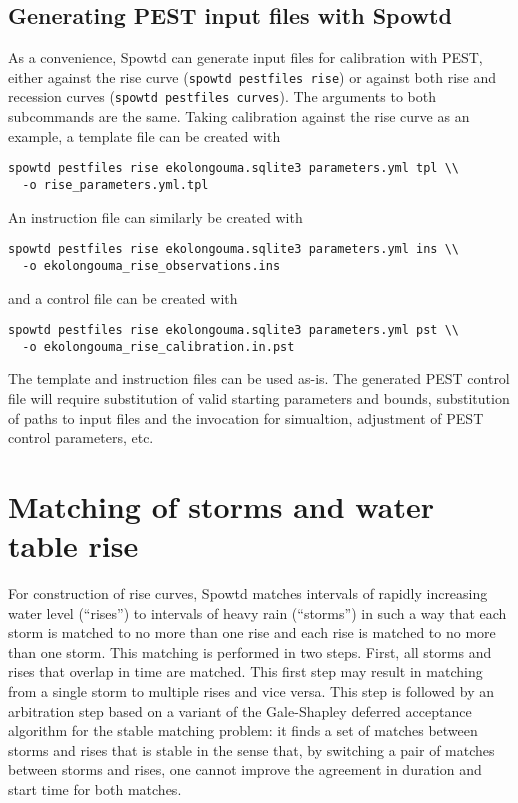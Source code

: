 \documentclass[11pt,a4paper]{article}
\begin{document}
\subsection{Generating PEST input files with Spowtd}
As a convenience, Spowtd can generate input files for calibration with
PEST, either against the rise curve (\texttt{spowtd pestfiles rise})
or against both rise and recession curves (\texttt{spowtd pestfiles
  curves}).  The arguments to both subcommands are the same.  Taking
calibration against the rise curve as an example, a template file
can be created with
\begin{lstlisting}[frame=single]
spowtd pestfiles rise ekolongouma.sqlite3 parameters.yml tpl \\
  -o rise_parameters.yml.tpl
\end{lstlisting}
An instruction file can similarly be created with
\begin{lstlisting}[frame=single]
spowtd pestfiles rise ekolongouma.sqlite3 parameters.yml ins \\
  -o ekolongouma_rise_observations.ins
\end{lstlisting}
and a control file can be created with
\begin{lstlisting}[frame=single]
spowtd pestfiles rise ekolongouma.sqlite3 parameters.yml pst \\
  -o ekolongouma_rise_calibration.in.pst
\end{lstlisting}
The template and instruction files can be used as-is.  The generated
PEST control file will require substitution of valid starting
parameters and bounds, substitution of paths to input files and the
invocation for simualtion, adjustment of PEST control parameters, etc.




\appendix

\section{Matching of storms and water table rise}
\label{a:storm_matching}

For construction of rise curves, Spowtd matches intervals of rapidly
increasing water level (``rises'') to intervals of heavy rain
(``storms'') in such a way that each storm is matched to no more than
one rise and each rise is matched to no more than one storm.  This
matching is performed in two steps.  First, all storms and rises that
overlap in time are matched.  This first step may result in matching
from a single storm to multiple rises and vice versa.  This step is
followed by an arbitration step based on a variant of the Gale-Shapley
deferred acceptance algorithm for the stable matching problem: it
finds a set of matches between storms and rises that is stable in the
sense that, by switching a pair of matches between storms and rises,
one cannot improve the agreement in duration and start time for both
matches.
\end{document}
